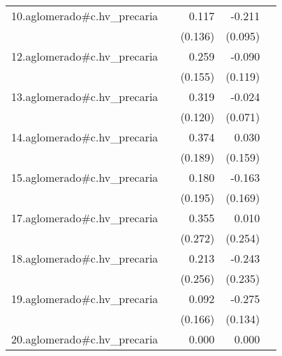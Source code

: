 {\begin{longtable}{l*{4}{D{.}{.}{-1}}}
\addlinespace
10.aglomerado#c.hv\_precaria&                     &       0.117         &      -0.211\sym{*}  &                     \\
            &                     &     (0.136)         &     (0.095)         &                     \\
\addlinespace
12.aglomerado#c.hv\_precaria&                     &       0.259         &      -0.090         &                     \\
            &                     &     (0.155)         &     (0.119)         &                     \\
\addlinespace
13.aglomerado#c.hv\_precaria&                     &       0.319\sym{**} &      -0.024         &                     \\
            &                     &     (0.120)         &     (0.071)         &                     \\
\addlinespace
14.aglomerado#c.hv\_precaria&                     &       0.374\sym{*}  &       0.030         &                     \\
            &                     &     (0.189)         &     (0.159)         &                     \\
\addlinespace
15.aglomerado#c.hv\_precaria&                     &       0.180         &      -0.163         &                     \\
            &                     &     (0.195)         &     (0.169)         &                     \\
\addlinespace
17.aglomerado#c.hv\_precaria&                     &       0.355         &       0.010         &                     \\
            &                     &     (0.272)         &     (0.254)         &                     \\
\addlinespace
18.aglomerado#c.hv\_precaria&                     &       0.213         &      -0.243         &                     \\
            &                     &     (0.256)         &     (0.235)         &                     \\
\addlinespace
19.aglomerado#c.hv\_precaria&                     &       0.092         &      -0.275\sym{*}  &                     \\
            &                     &     (0.166)         &     (0.134)         &                     \\
\addlinespace
20.aglomerado#c.hv\_precaria&                     &       0.000         &       0.000         &                     \\

\end{longtable}}
